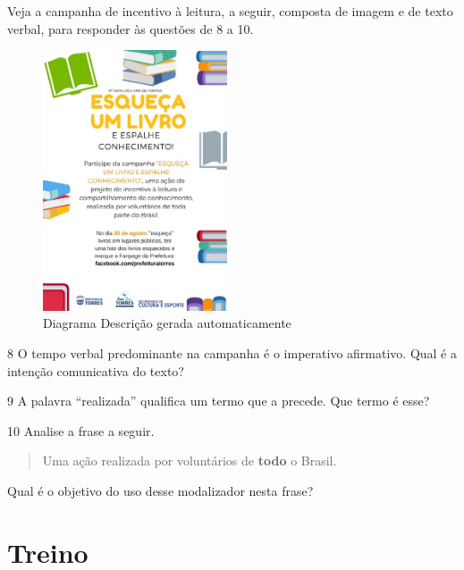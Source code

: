 \noindent Veja a campanha de incentivo à leitura, a seguir, composta de imagem e
de texto verbal, para responder às questões de 8 a 10.

\begin{figure}[H]
\centering\includegraphics[width=2.14842in,height=3.03846in]{./imgSAEB_6_POR/media/image25.jpeg}
\caption{Diagrama Descrição gerada automaticamente}
\end{figure}


\num{8} O tempo verbal predominante na campanha é o imperativo
afirmativo. Qual é a intenção comunicativa do texto?


\num{9} A palavra ``realizada'' qualifica um termo que a precede. Que
termo é esse?\EP[1]


\num{10} Analise a frase a seguir.

\begin{quote}
Uma ação realizada por voluntários de \textbf{{todo}} o Brasil.
\end{quote}

\noindent Qual é o objetivo do uso desse modalizador nesta frase?


\section*{Treino}

